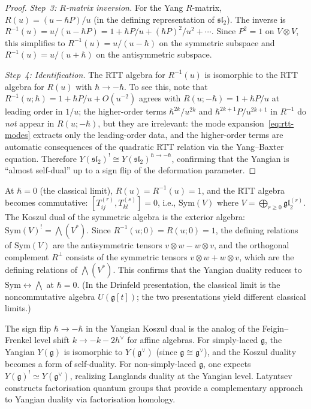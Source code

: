 \begin{proof}
\emph{Step~3: $R$-matrix inversion.}
For the Yang $R$-matrix, $R(u) = (u - \hbar P)/u$ (in the defining representation of $\mathfrak{sl}_2$).  The inverse is $R^{-1}(u) = u/(u - \hbar P) = 1 + \hbar P/u + (\hbar P)^2/u^2 + \cdots$.  Since $P^2 = 1$ on $V \otimes V$, this simplifies to $R^{-1}(u) = u/(u-\hbar)$ on the symmetric subspace and $R^{-1}(u) = u/(u+\hbar)$ on the antisymmetric subspace.

\emph{Step~4: Identification.}
The RTT algebra for $R^{-1}(u)$ is isomorphic to the RTT algebra for $R(u)$ with $\hbar \to -\hbar$.  To see this, note that $R^{-1}(u; \hbar) = 1 + \hbar P/u + O(u^{-2})$ agrees with $R(u; -\hbar) = 1 + \hbar P/u$ at leading order in $1/u$; the higher-order terms $\hbar^{2k}/u^{2k}$ and $\hbar^{2k+1}P/u^{2k+1}$ in $R^{-1}$ do \emph{not} appear in $R(u;-\hbar)$, but they are irrelevant: the mode expansion~\eqref{eq:rtt-modes} extracts only the leading-order data, and the higher-order terms are automatic consequences of the quadratic RTT relation via the Yang--Baxter equation.  Therefore $Y(\mathfrak{sl}_2)^! \cong Y(\mathfrak{sl}_2)^{\hbar \to -\hbar}$, confirming that the Yangian is ``almost self-dual'' up to a sign flip of the deformation parameter.
\end{proof}

\begin{corollary}\label{cor:yangian-classical-self-dual}
At $\hbar = 0$ (the classical limit), $R(u) = R^{-1}(u) = 1$, and the RTT algebra becomes commutative: $[T_{ij}^{(r)}, T_{kl}^{(s)}] = 0$, i.e., $\mathrm{Sym}(V)$ where $V = \bigoplus_{r \geq 0} \mathfrak{gl}_2^{(r)}$.  The Koszul dual of the symmetric algebra is the exterior algebra: $\mathrm{Sym}(V)^! = \bigwedge(V^*)$.  Since $R^{-1}(u;0) = R(u;0) = 1$, the defining relations of $\mathrm{Sym}(V)$ are the antisymmetric tensors $v \otimes w - w \otimes v$, and the orthogonal complement $R^\perp$ consists of the symmetric tensors $v \otimes w + w \otimes v$, which are the defining relations of $\bigwedge(V^*)$.  This confirms that the Yangian duality reduces to $\mathrm{Sym} \leftrightarrow \bigwedge$ at $\hbar = 0$.  (In the Drinfeld presentation, the classical limit is the noncommutative algebra $U(\mathfrak{g}[t])$; the two presentations yield different classical limits.)
\end{corollary}

\begin{remark}\label{rem:yangian-langlands}
The sign flip $\hbar \to -\hbar$ in the Yangian Koszul dual is the analog of the Feigin--Frenkel level shift $k \to -k - 2h^\vee$ for affine algebras.  For simply-laced $\mathfrak{g}$, the Yangian $Y(\mathfrak{g})$ is isomorphic to $Y(\mathfrak{g}^\vee)$ (since $\mathfrak{g} \cong \mathfrak{g}^\vee$), and the Koszul duality becomes a form of self-duality.  For non-simply-laced $\mathfrak{g}$, one expects $Y(\mathfrak{g})^! \simeq Y(\mathfrak{g}^\vee)$, realizing Langlands duality at the Yangian level.  Latyntsev \cite{Latyntsev23} constructs factorisation quantum groups that provide a complementary approach to Yangian duality via factorisation homology.
\end{remark}

